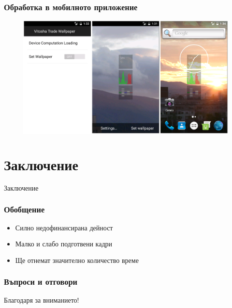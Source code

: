 \documentclass{beamer}
\begin{document}
\begin{frame}
\frametitle{Обработка в мобилното приложение}
\begin{figure}[h]
  \centering
  \includegraphics[width=\textwidth]{MobileClient.png}
\end{figure}
\end{frame}

\section{Заключение}

\begin{frame}
\center \huge{Заключение}
\end{frame}

\begin{frame}
\frametitle{Обобщение}
\begin{itemize}
	\item Силно недофинансирана дейност
	\item Малко и слабо подготвени кадри
	\item Ще отнемат значително количество време
\end{itemize}
\end{frame}

\begin{frame}
\frametitle{Въпроси и отговори}
\center \huge{Благодаря за вниманието!}
\end{frame}
\end{document}
